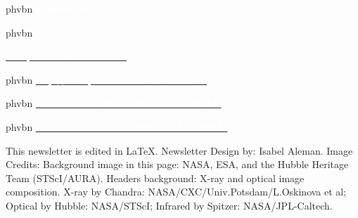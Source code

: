 \begin{multicols}{2}
\begin{shaded}
\fontsize{16}{10}  {phv}{b}{n} \selectfont \noindent \textcolor{white}{\textbf{Contact us:}}

\vspace{0.1cm}

\fontsize{12}{13}  {phv}b{n} \selectfont 

\noindent \href{mailto:astropah@strw.leidenuniv.nl}{\textcolor{white}{astropah@strw.leidenuniv.nl}}



\fontsize{12}{13}  {phv}{b}{n} \selectfont 
\noindent \href{http://astropah-news.strw.leidenuniv.nl}{\textcolor{white}{http://astropah-news.strw.leidenuniv.nl}}



\fontsize{12}{13}  {phv}{b}{n} \selectfont 
\noindent \textbf{\href{https://mail.strw.leidenuniv.nl/mailman/listinfo/astropah-news}{\textcolor{white}{Click here to Subscribe to AstroPAH}}}



\fontsize{12}{13}  {phv}{b}{n} \selectfont 
\noindent \textbf{\href{http://astropah-news.strw.leidenuniv.nl/submit.html}{\textcolor{white}{Click here to Contribute to AstroPAH}}}

\vspace{0.1cm}

\end{shaded}


\end{multicols}


\fontsize{9}{10}
\selectfont
\noindent This newsletter is edited in \LaTeX. Newsletter Design by: Isabel Aleman. Image Credits: Background image in this page: NASA, ESA, and the Hubble Heritage Team (STScI/AURA). Headers background: X-ray and optical image composition. X-ray by Chandra: NASA/CXC/Univ.Potsdam/L.Oskinova et al; Optical by Hubble: NASA/STScI; Infrared by Spitzer: NASA/JPL-Caltech.

\newpage 

